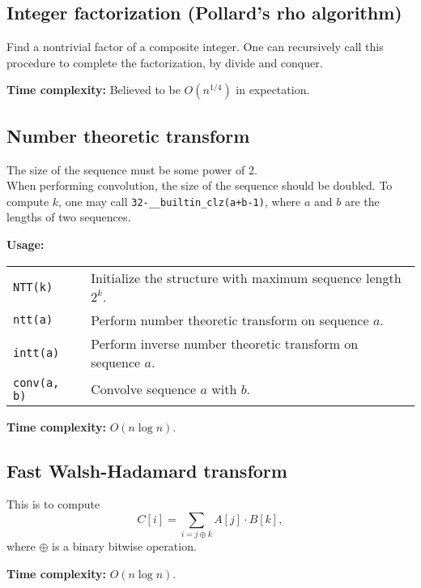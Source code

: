 \subsection{Integer factorization (Pollard's rho algorithm)}
Find a nontrivial factor of a composite integer. One can recursively call this procedure to complete the factorization, by divide and conquer. \par
\textbf{Time complexity:} Believed to be $O(n^{1/4})$ in expectation. \par


\subsection{Number theoretic transform}
\Warning The size of the sequence must be some power of 2. \\
\Warning When performing convolution, the size of the sequence should be doubled. To compute $k$, one may call \lstinline|32-__builtin_clz(a+b-1)|, where $a$ and $b$ are the lengths of two sequences.  \par
\textbf{Usage:} \\[0.1cm]
\begin{tabular}{p{2cm} p{9.5cm}}
  \lstinline|NTT(k)| & Initialize the structure with maximum sequence length $2^k$. \\
  \lstinline|ntt(a)| & Perform number theoretic transform on sequence $a$.  \\
  \lstinline|intt(a)| & Perform inverse number theoretic transform on sequence $a$. \\
  \lstinline|conv(a, b)| & Convolve sequence $a$ with $b$. \\
\end{tabular} \par
\textbf{Time complexity:} $O(n \log n)$. \par


\subsection{Fast Walsh-Hadamard transform}
This is to compute $$C[i] = \sum_{i = j \oplus k} A[j] \cdot B[k],$$ where $\oplus$ is a binary bitwise operation. \par
\textbf{Time complexity:} $O(n \log n)$. \par


